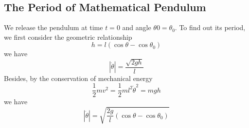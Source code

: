 \documentclass[12pt]{report}
\begin{document}
\subsection{The Period of Mathematical Pendulum}
We release the pendulum at time $t=0$ and angle $\theta{0}=\theta_0$. To find out its period, we first consider the geometric relationship
\begin{equation}
    h=l(\cos{\theta}-\cos{\theta_0})
\end{equation}
we have
\begin{equation}
    \left|\dot{\theta}\right|=\dfrac{\sqrt{2gh}}{l}
\end{equation}
Besides, by the conservation of mechanical energy
\begin{equation}
    \dfrac{1}{2}mv^2=\dfrac{1}{2}ml^2\dot{\theta}^2=mgh
\end{equation}
we have
\begin{equation}
    \left|\dot{\theta}\right|=\sqrt{\dfrac{2g}{l}(\cos{\theta}-\cos{\theta_0})}
\end{equation}
\end{document}
